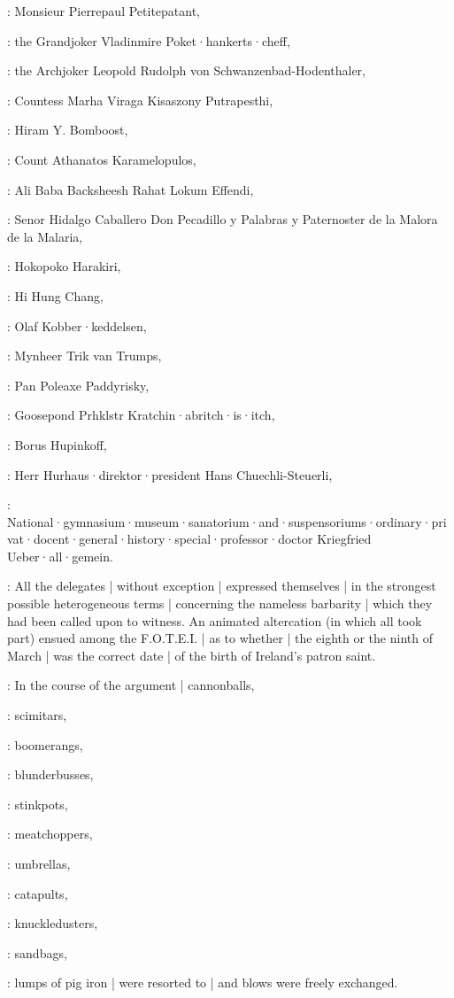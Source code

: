 :
Monsieur Pierrepaul Petitepatant,

:
the Grandjoker Vladinmire Poket·hankerts·cheff,

:
the Archjoker Leopold Rudolph von Schwanzenbad-Hodenthaler,

:
Countess Marha Viraga Kisaszony Putrapesthi,

:
Hiram Y. Bomboost,

:
Count Athanatos Karamelopulos,

:
Ali Baba Backsheesh Rahat Lokum Effendi,

:
Senor Hidalgo Caballero Don Pecadillo y Palabras y Paternoster de la Malora de la Malaria,

:
Hokopoko Harakiri,

:
Hi Hung Chang,

:
Olaf Kobber·keddelsen,

:
Mynheer Trik van Trumps,

:
Pan Poleaxe Paddyrisky,

:
Goosepond Prhklstr Kratchin·abritch·is·itch,

:
Borus Hupinkoff,

:
Herr Hurhaus·direktor·president Hans Chuechli-Steuerli,

:
National·gymnasium·museum·sanatorium·and·suspensoriums·ordinary·privat·docent·general·history·special·professor·doctor
Kriegfried Ueber·all·gemein.

:
All the delegates |
without exception |
expressed themselves |
in the strongest possible heterogeneous terms |
concerning the nameless barbarity |
which they had been called upon to witness.
An animated altercation
(in which all took part)
ensued among the F.O.T.E.I. |
as to whether |
the eighth or the ninth of March |
was the correct date |
of the birth of Ireland's patron saint.

:
In the course of the argument |
cannonballs,

:
scimitars,

:
boomerangs,

:
blunderbusses,

:
stinkpots,

:
meatchoppers,

:
umbrellas,

:
catapults,

:
knuckledusters,

:
sandbags,

:
lumps of pig iron |
were resorted to |
and blows were freely exchanged.

